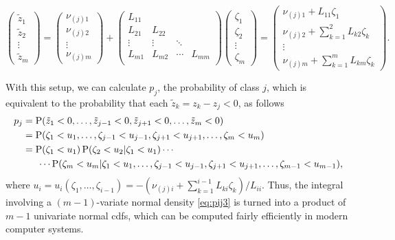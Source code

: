\begin{equation*}
  \begin{pmatrix}
    \tilde z_1 \\
    \tilde z_2 \\
    \vdots \\
    \tilde z_m
  \end{pmatrix}  
  =
  \begin{pmatrix}
    \nu_{(j)1} \\
    \nu_{(j)2} \\    
    \vdots \\
    \nu_{(j)m}
  \end{pmatrix}  
  +
  \begin{pmatrix}
    L_{11} &       &       & \\
    L_{21} &L_{22} &       & \\
    \vdots &\vdots &\ddots & \\
    L_{m1} &L_{m2} &\cdots &L_{mm} \\
  \end{pmatrix} 
  \begin{pmatrix}
    \zeta_1 \\
    \zeta_2 \\    
    \vdots \\
    \zeta_m
  \end{pmatrix}
  =
  \begin{pmatrix}
    \nu_{(j)1} + L_{11}\zeta_1 \\
    \nu_{(j)2} + \sum_{k=1}^2 L_{k2} \zeta_k \\    
    \vdots \\
    \nu_{(j)m} + \sum_{k=1}^m L_{km} \zeta_k
  \end{pmatrix}.  
\end{equation*}

With this setup, we can calculate $p_{j}$, the probability of class $j$, which is equivalent to the probability that each $\tilde z_k = z_k - z_j < 0$, as follows
\begin{align*}
  p_j 
  &= \operatorname{P}(\tilde z_1 < 0,\dots,\tilde z_{j-1} < 0, \tilde z_{j+1} < 0,\dots, \tilde z_m < 0) \\
  &= 
  \operatorname{P}(\zeta_1 < u_1,\dots,\zeta_{j-1}<u_{j-1},\zeta_{j+1}<u_{j+1},\dots,\zeta_{m}<u_{m}) \\
  &= 
  \operatorname{P}(\zeta_1 < u_1)
  \operatorname{P}(\zeta_2 < u_2|\zeta_1 < u_1)
  \cdots \\
  &\phantom{==}\cdots
  \operatorname{P}(\zeta_{m}<u_{m}|\zeta_1 < u_1,\dots,\zeta_{j-1}<u_{j-1},\zeta_{j+1}<u_{j+1},\dots,\zeta_{m-1}<u_{m-1}),
\end{align*}
where $u_i = u_i(\zeta_1,\dots,\zeta_{i-1}) = - (\nu_{(j)i} + \sum_{k=1}^{i-1} L_{ki}\zeta_k) / L_{ii}$.
Thus, the integral involving a $(m-1)$-variate normal density \cref{eq:pij3} is turned into a product of $m-1$ univariate normal cdfs, which can be computed fairly efficiently in modern computer systems.

